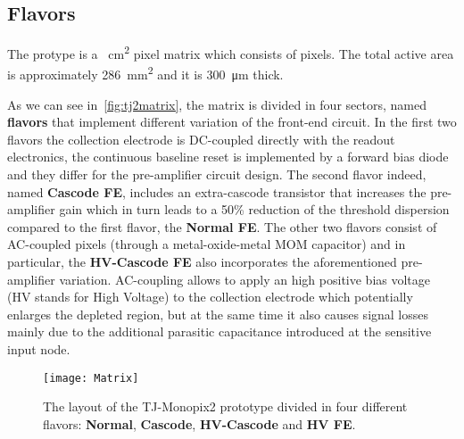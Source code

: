 
\subsection{Flavors} \label{sec:flavors}

The protype is a ~\unit{cm^{2}} pixel matrix which consists of  pixels. The total active area is approximately \SI{286}{mm^{2}} and it is \SI{300}{\micro m} thick.

\begin{comment}
\begin{figure}[h!]
\centering
\texttt{[image: Tj1pix\_cov]}
\caption{Detection efficiency map of a TJ-Monopix1 chip with \SI{25}{\micro m} p-epitaxial layer that has been irradiated to \SI{e15}{n_{\textit{eq}}/cm^{2}} NIEL.}
\label{fig:tj1pix_cov}
\end{figure}
\end{comment}

As we can see in~\autoref{fig:tj2matrix}, the matrix is divided in four sectors, named \textbf{flavors} that implement different variation of the front-end circuit. In the first two flavors the collection electrode is DC-coupled directly with the readout electronics,  the continuous baseline reset is implemented by a forward bias diode and they differ for the pre-amplifier circuit design. The second flavor indeed, named \textbf{Cascode FE}, includes an extra-cascode transistor that increases the pre-amplifier gain which in turn leads to a 50\% reduction of the threshold dispersion compared to the first flavor, the \textbf{Normal FE}. The other two flavors consist of AC-coupled pixels (through a metal-oxide-metal MOM capacitor) and in particular, the \textbf{HV-Cascode FE} also incorporates the aforementioned pre-amplifier variation. AC-coupling allows to apply an high positive bias voltage (HV stands for High Voltage) to the collection electrode which potentially enlarges the depleted region, but at the same time it also causes signal losses mainly due to the additional parasitic capacitance introduced at the sensitive input node.\\


\begin{figure}[h!]
\centering
\texttt{[image: Matrix]}
\caption{The layout of the TJ-Monopix2 prototype divided in four different flavors: \textbf{Normal}, \textbf{Cascode}, \textbf{HV-Cascode} and \textbf{HV FE}.}
\label{fig:tj2matrix}
\end{figure}


